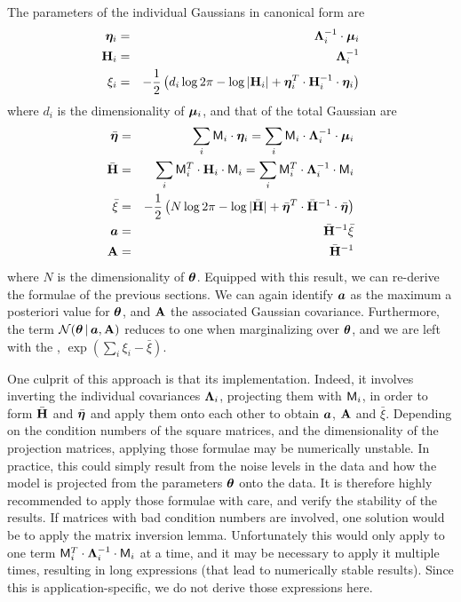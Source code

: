 The parameters of the individual Gaussians in canonical form are
\begin{eqnarray}
\boldsymbol{\eta}_i &=& \mathbf{\Lambda}_i^{-1} \cdot \boldsymbol{\mu}_i \\
\mathbf{H}_i  &=& \mathbf{\Lambda}_i^{-1}\\
\xi_i &=& -\frac{1}{2}\left( d_i \log 2\pi -\log|\mathbf{H}_i| + \boldsymbol{\eta}_i^T \cdot \mathbf{H}_i^{-1}\cdot \boldsymbol{\eta}_i \right)
\end{eqnarray}
where $d_i$ is the dimensionality of $\boldsymbol{\mu}_i$, and that of the total Gaussian are
\begin{eqnarray}
\bar{\boldsymbol{\eta}} &=& \sum_i \mathsf{M}_i \cdot \boldsymbol{\eta}_i = \sum_i \mathsf{M}_i \cdot  \mathbf{\Lambda}_i^{-1} \cdot \boldsymbol{\mu}_i  \\
\bar{\mathbf{H}} &=& \sum_i  \mathsf{M}_i^T\cdot \mathbf{H}_i\cdot \mathsf{M}_i = \sum_i  \mathsf{M}_i^T\cdot \mathbf{\Lambda}_i^{-1}\cdot \mathsf{M}_i \\
 \bar{\xi} &=&  -\frac{1}{2}\left( N\log 2\pi -\log|\bar{\mathbf{H}} | + \bar{\boldsymbol{\eta}}^T \cdot \bar{\mathbf{H}}^{-1}\cdot \bar{\boldsymbol{\eta}} \right)\\
\boldsymbol{a} &=&  \bar{\mathbf{H}}^{-1} \bar{\xi} \\
\mathbf{A} &=& \bar{\mathbf{H}}^{-1}
\end{eqnarray}
where $N$ is the dimensionality of $\boldsymbol{\theta}$.
Equipped with this result, we can re-derive the formulae of the previous sections.
We can again identify $\boldsymbol{a}$ as the maximum a posteriori value for $\boldsymbol{\theta}$, and $\mathbf{A}$ the associated Gaussian covariance.
Furthermore, the term $ \mathcal{N}\!\,(\boldsymbol{\theta}\,|\,\boldsymbol{a},\mathbf{A}) $ reduces to one when marginalizing over $\boldsymbol{\theta}$, and we are left with the \FML, $ \exp\left(\textstyle{\sum_i} \xi_i - \bar{\xi} \right)$.

One culprit of this approach is that its implementation. Indeed, it involves inverting the individual covariances $\mathbf{\Lambda}_i$, projecting them with $\mathsf{M}_i$, in order to form $\bar{\mathbf{H}}$ and  $\bar{\boldsymbol{\eta}}$ and apply them onto each other to obtain $\boldsymbol{a}$, $\mathbf{A}$ and $ \bar{\xi}$. Depending on the condition numbers of the square matrices, and the dimensionality of the projection matrices, applying those formulae may be numerically unstable. In practice, this could simply result from the noise levels in the data and how the model is projected from the parameters $\boldsymbol{\theta}$ onto the data.
It is therefore highly recommended to apply those formulae with care, and verify the stability of the results.
If matrices with bad condition numbers are involved, one solution would be to apply the matrix inversion lemma. Unfortunately this would only apply to one term $\mathsf{M}_i^T\cdot \mathbf{\Lambda}_i^{-1}\cdot \mathsf{M}_i$ at a time, and it may be necessary to apply it multiple times, resulting in long expressions (that lead to numerically stable results).
Since this is application-specific, we do not derive those expressions here.






